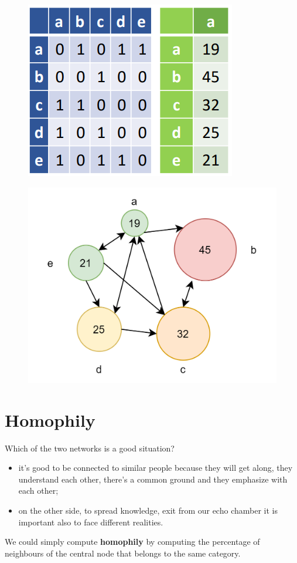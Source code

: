 \documentclass[
  notitlepage,
  onecolumn,
  openany]{book}
\providecommand{\tightlist}{%
  \setlength{\itemsep}{0pt}\setlength{\parskip}{0pt}}
\begin{document}
\begin{figure}[h!]

{\centering \includegraphics[width=0.3\linewidth]{images/06-Attributes based measures/Untitled 1} 

}

\end{figure}

\begin{figure}[h!]

{\centering \includegraphics[width=0.5\linewidth]{images/06-Attributes based measures/08-graph} 

}

\end{figure}

\hypertarget{homophily}{%
\section{Homophily}\label{homophily}}

Which of the two networks is a good situation?

\begin{itemize}
\tightlist
\item
  it's good to be connected to similar people because they will get along, they understand each other, there's a common ground and they emphasize with each other;
\item
  on the other side, to spread knowledge, exit from our echo chamber it is important also to face different realities.
\end{itemize}

We could simply compute \textbf{homophily} by computing the percentage of neighbours of the central node that belongs to the same category.
\end{document}
